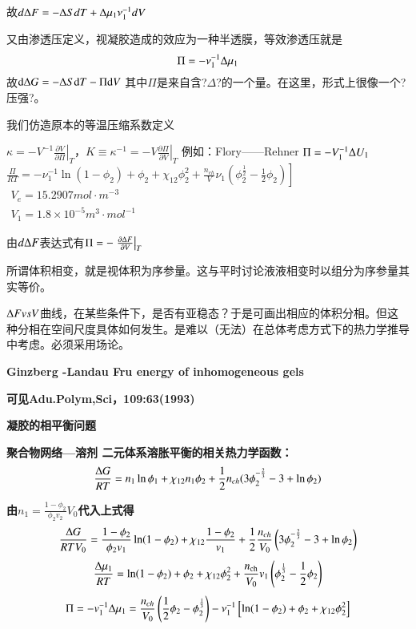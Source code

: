 \documentclass{article} %
\begin{document}
\noindent 故$d{\rm \Delta }F=-{\rm \Delta }SdT+{\rm \Delta }\mu _{1} \nu _{1}^{-1} dV$

\noindent 又由渗透压定义，视凝胶造成的效应为一种半透膜，等效渗透压就是
\[{\rm \Pi }=-\nu _{1}^{-1} {\rm \Delta }\mu _{1} \] 
故${\rm d\Delta }G=-{\rm \Delta }S{\rm d}T-{\rm \Pi d}V$ 其中$\Pi $是来自含?$\Delta $?的一个量。在这里，形式上很像一个?压强?。

\noindent 我们仿造原本的等温压缩系数定义

\noindent $\left. \kappa =-V^{-1} \frac{\partial V}{\partial \Pi } \right|_{T} $，$K\equiv \kappa ^{-1} =\left. -V\frac{\partial \Pi }{\partial V} \right|_{T} $ 例如：Flory------Rehner $\Pi =-V_{1}^{-1} {\rm \Delta }U_{1} $ $\left. \frac{\Pi }{RT} =-\nu _{1}^{-1} \ln (1-\phi _{2} )+\phi _{2} +\chi _{12} \phi _{2}^{2} +\frac{n_{ch} }{V} \nu _{1} \left(\phi _{2}^{\frac{1}{2} } -\frac{1}{2} \phi _{2} \right)\right]$ $\begin{array}{c} {V_{e} =15.2907mol\cdot m^{-3} } \\ {V_{1} =1.8\times 10^{-5} m^{3} \cdot mol^{-1} } \end{array}$

\noindent 由$d{\rm \Delta }F$表达式有$\Pi =-\left. \frac{\partial {\rm \Delta }F}{\partial V} \right|_{T} $

\noindent 所谓体积相变，就是视体积为序参量。这与平时讨论液液相变时以组分为序参量其实等价。

\noindent ${\rm \Delta }FvsV$曲线，在某些条件下，是否有亚稳态？于是可画出相应的体积分相。但这种分相在空间尺度具体如何发生。是难以（无法）在总体考虑方式下的热力学推导中考虑。必须采用场论。


{\bf  Ginzberg -Landau Fru energy of inhomogeneous gels}

\noindent 
{\bf 可见Adu.Polym,Sci，109:63(1993)}

\noindent \eject 

\noindent \textbf{凝胶的相平衡问题}


{\bf  聚合物网络---溶剂 二元体系溶胀平衡的相关热力学函数：
\[\frac{{\rm \Delta }G}{RT} =n_{1} \ln \phi _{1} +\chi _{12} n_{1} \phi _{2} +\frac{1}{2} n_{ch} (3\phi _{2}^{-\frac{2}{3} } -3+\ln \phi _{2} )\] }

{\bf 由$n_{1} =\frac{1-\phi _{2} }{\phi _{2} v_{2} } V_{0} $代入上式得
\[\frac{{\rm \Delta }G}{RTV_{0} } =\frac{1-\phi _{2} }{\phi _{2} v_{1} } \ln (1-\phi _{2} )+\chi _{12} \frac{1-\phi _{2} }{v_{1} } +\frac{1}{2} \frac{n_{ch} }{V_{0} } \left(3\phi _{2}^{-\frac{2}{3} } -3+\ln \phi _{2} \right)\] 
\[\frac{{\rm \Delta }\mu _{1} }{RT} =\ln (1-\phi _{2} )+\phi _{2} +\chi _{12} \phi _{2}^{2} +\frac{n_{{\rm ch}} }{V_{0} } v_{1} \left(\phi _{2}^{\frac{1}{3} } -\frac{1}{2} \phi _{2} \right)\] 
\[\Pi =-v_{1}^{-1} {\rm \Delta }\mu _{1} =\frac{n_{ch} }{V_{0} } \left(\frac{1}{2} \phi _{2} -\phi _{2}^{\frac{1}{3} } \right)-\nu _{1}^{-1} \left[\ln (1-\phi _{2} )+\phi _{2} +\chi _{12} \phi _{2}^{2} \right]\] }
\end{document}
